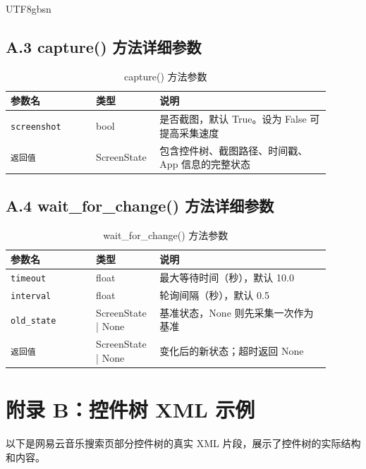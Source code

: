\documentclass{article}
\begin{document}
\begin{CJK}{UTF8}{gbsn}
\subsection*{A.3 capture() 方法详细参数}

\begin{table}[h]
  \centering
  \caption{capture() 方法参数}
  \label{tab:api_capture}
  \begin{tabular}{p{0.25\linewidth}p{0.15\linewidth}p{0.5\linewidth}}
    \toprule
    参数名 & 类型 & 说明 \\
    \midrule
    \texttt{screenshot} & bool & 是否截图，默认 True。设为 False 可提高采集速度 \\
    \texttt{返回值} & ScreenState & 包含控件树、截图路径、时间戳、App 信息的完整状态 \\
    \bottomrule
  \end{tabular}
\end{table}

\subsection*{A.4 wait\_for\_change() 方法详细参数}

\begin{table}[h]
  \centering
  \caption{wait\_for\_change() 方法参数}
  \label{tab:api_wait}
  \begin{tabular}{p{0.25\linewidth}p{0.15\linewidth}p{0.5\linewidth}}
    \toprule
    参数名 & 类型 & 说明 \\
    \midrule
    \texttt{timeout} & float & 最大等待时间（秒），默认 10.0 \\
    \texttt{interval} & float & 轮询间隔（秒），默认 0.5 \\
    \texttt{old\_state} & ScreenState | None & 基准状态，None 则先采集一次作为基准 \\
    \texttt{返回值} & ScreenState | None & 变化后的新状态；超时返回 None \\
    \bottomrule
  \end{tabular}
\end{table}

\section*{附录 B：控件树 XML 示例}

以下是网易云音乐搜索页部分控件树的真实 XML 片段，展示了控件树的实际结构和内容。


\end{CJK}
\end{document}
